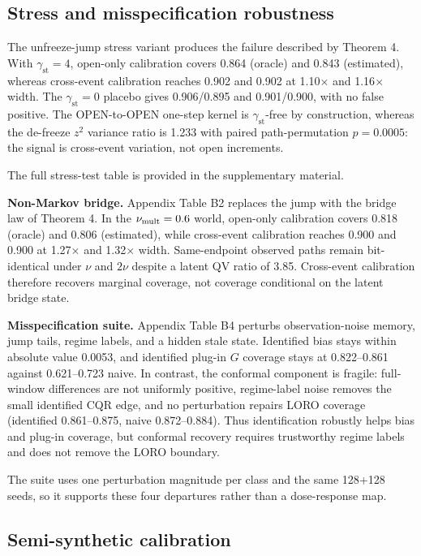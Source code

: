 \subsection{Stress and misspecification robustness}

The unfreeze-jump stress variant produces the failure described by Theorem 4. With $\gamma_{\mathrm{st}}=4$, open-only calibration covers 0.864 (oracle) and 0.843 (estimated), whereas cross-event calibration reaches 0.902 and 0.902 at 1.10$\times$ and 1.16$\times$ width. The $\gamma_{\mathrm{st}}=0$ placebo gives 0.906/0.895 and 0.901/0.900, with no false positive. The OPEN-to-OPEN one-step kernel is $\gamma_{\mathrm{st}}$-free by construction, whereas the de-freeze $z^2$ variance ratio is 1.233 with paired path-permutation $p=0.0005$: the signal is cross-event variation, not open increments.

The full stress-test table is provided in the supplementary material.

\textbf{Non-Markov bridge.} Appendix Table B2 replaces the jump with the bridge law of Theorem 4. In the $\nu_{\rm mult}=0.6$ world, open-only calibration covers 0.818 (oracle) and 0.806 (estimated), while cross-event calibration reaches 0.900 and 0.900 at 1.27$\times$ and 1.32$\times$ width. Same-endpoint observed paths remain bit-identical under $\nu$ and $2\nu$ despite a latent QV ratio of 3.85. Cross-event calibration therefore recovers marginal coverage, not coverage conditional on the latent bridge state.

\textbf{Misspecification suite.} Appendix Table B4 perturbs observation-noise memory, jump tails, regime labels, and a hidden stale state. Identified bias stays within absolute value 0.0053, and identified plug-in $G$ coverage stays at 0.822--0.861 against 0.621--0.723 naive. In contrast, the conformal component is fragile: full-window differences are not uniformly positive, regime-label noise removes the small identified CQR edge, and no perturbation repairs LORO coverage (identified 0.861--0.875, naive 0.872--0.884). Thus identification robustly helps bias and plug-in coverage, but conformal recovery requires trustworthy regime labels and does not remove the LORO boundary.

The suite uses one perturbation magnitude per class and the same 128+128 seeds, so it supports these four departures rather than a dose-response map.

\subsection{Semi-synthetic calibration}

